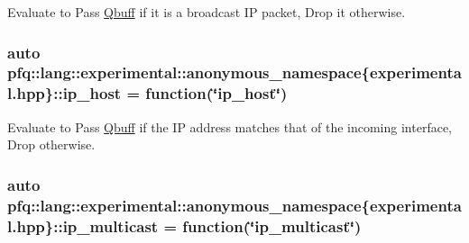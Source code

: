 Evaluate to {\ttfamily Pass} \hyperlink{structpfq_1_1lang_1_1Qbuff}{Qbuff} if it is a broadcast IP packet, {\ttfamily Drop} it otherwise. 

\subsubsection[{\texorpdfstring{ip\+\_\+host}{ip_host}}]{\setlength{\rightskip}{0pt plus 5cm}auto pfq\+::lang\+::experimental\+::anonymous\+\_\+namespace\{experimental.\+hpp\}\+::ip\+\_\+host = {\bf function}(\char`\"{}ip\+\_\+host\char`\"{})}\hypertarget{namespacepfq_1_1lang_1_1experimental_1_1anonymous__namespace_02experimental_8hpp_03_ab651cc72b27d482a4ae6c415f50780cd}{}\label{namespacepfq_1_1lang_1_1experimental_1_1anonymous__namespace_02experimental_8hpp_03_ab651cc72b27d482a4ae6c415f50780cd}


Evaluate to {\ttfamily Pass} \hyperlink{structpfq_1_1lang_1_1Qbuff}{Qbuff} if the IP address matches that of the incoming interface, {\ttfamily Drop} otherwise. 

\subsubsection[{\texorpdfstring{ip\+\_\+multicast}{ip_multicast}}]{\setlength{\rightskip}{0pt plus 5cm}auto pfq\+::lang\+::experimental\+::anonymous\+\_\+namespace\{experimental.\+hpp\}\+::ip\+\_\+multicast = {\bf function}(\char`\"{}ip\+\_\+multicast\char`\"{})}\hypertarget{namespacepfq_1_1lang_1_1experimental_1_1anonymous__namespace_02experimental_8hpp_03_ab9e6818d6b72bab5885dda6212a3ba52}{}\label{namespacepfq_1_1lang_1_1experimental_1_1anonymous__namespace_02experimental_8hpp_03_ab9e6818d6b72bab5885dda6212a3ba52}


